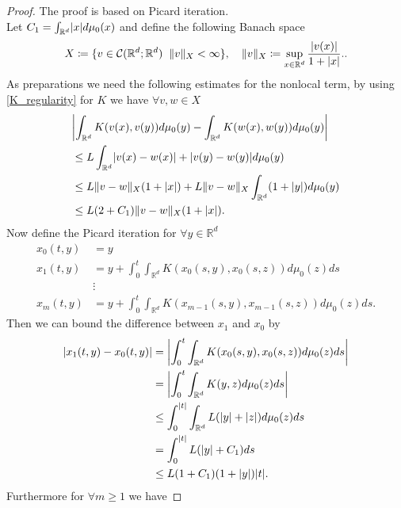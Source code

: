 \begin{proof}
  The proof is based on Picard iteration. \\[1ex] 
  Let $C_1 = \int_{\mathbb{R}^{d} } \abs{x} d\mu_0(x)$ and define the following Banach space 
  \begin{align*}
    X \coloneqq  \{v \in  \mathcal{C}(\mathbb{R}^{d};\R^d) \: \ \|v\|_{X} < \infty\},  \quad  \|v\|_X \coloneqq \sup_{x \in  \mathbb{R}^{d} } \frac{\abs{v(x)}}{1+\abs{x}}.
  .\end{align*}
  As preparations we need the following estimates for the nonlocal term, by using \autoref{K_regularity} for $K$
  we have $\forall  v , w \in  X$ 
  \begin{align*}
    &\abs*{\int_{\mathbb{R}^{d} }K(v(x),v(y)) d\mu_0(y) - \int_{\mathbb{R}^{d} }K(w(x),w(y)) d\mu_0(y)}\\
    &\le L \int_{\mathbb{R}^{d} } \abs{v(x)-w(x)} + \abs{v(y) - w(y)} d\mu_0(y)\\
    &\le  L \|v-w\|_{X}(1+\abs{x}) + L \|v-w\|_{X} \int_{\mathbb{R}^{d} } (1+\abs{y}) d\mu_0(y) \\
    &\le  L(2+C_{1})\|v - w\|_X (1+\abs{x})
  .\end{align*}
  Now define the Picard iteration for $\forall  y \in  \mathbb{R}^{d} $
  \begin{align*}
    x_0(t,y) &= y \\
    x_1(t,y) &= y + \int_0^{t} \int_{\mathbb{R}^{d}} K(x_{0}(s,y),x_0(s,z))d\mu_0(z)ds\\
             &\vdots \\
    x_m(t,y) &= y + \int_0^{t} \int_{\mathbb{R}^{d}} K(x_{m-1}(s,y),x_{m-1}(s,z))d\mu_0(z)ds.
  \end{align*}
  Then we can bound the difference between $x_{1}$ and $x_{0}$ by 
  \begin{align*}
    \abs{x_1(t,y) - x_{0}(t,y)} &= \abs*{\int_0^{t} \int_{\mathbb{R}^{d} }  K(x_{0}(s,y),x_{0}(s,z)) d\mu_0(z) ds} \\
                                &= \abs*{\int_0^{t} \int_{\mathbb{R}^{d} } K(y,z) d\mu_0(z) ds}\\
                                &\le \int_0^{\abs{t}}  \int_{\mathbb{R}^{d} }L(\abs{y} + \abs{z}) d\mu_0(z)ds\\
                                &= \int_0^{\abs{t}}  L(\abs{y} + C_1) ds \\
                                &\le L(1+C_{1})(1+\abs{y})\abs{t}
  .\end{align*}
  Furthermore for $\forall m\ge 1$ we have 

\end{proof}
